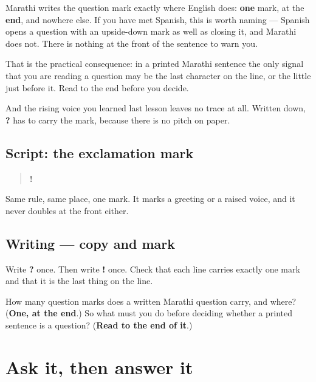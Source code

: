 Marathi writes the question mark exactly where English does: \textbf{one} mark, at the \textbf{end}, and nowhere else. If you have met Spanish, this is worth naming — Spanish opens a question with an upside-down mark as well as closing it, and Marathi does not. There is nothing at the front of the sentence to warn you.

That is the practical consequence: in a printed Marathi sentence the only signal that you are reading a question may be the last character on the line, or the little \textbf{} just before it. Read to the end before you decide.

And the rising voice you learned last lesson leaves no trace at all. Written down, \textbf{?} has to carry the mark, because there is no pitch on paper.

\subsection*{Script: the exclamation mark}
\begin{quote}
\textbf{!}
\end{quote}

Same rule, same place, one mark. It marks a greeting or a raised voice, and it never doubles at the front either.

\subsection*{Writing — copy and mark}
Write \textbf{  ?} once. Then write \textbf{!} once. Check that each line carries exactly one mark and that it is the last thing on the line.

\begin{tcolorbox}[breakable,colback=teal!4,colframe=teal!35!black,title={Before you move on}]
How many question marks does a written Marathi question carry, and where? (\textbf{One, at the end}.) So what must you do before deciding whether a printed sentence is a question? (\textbf{Read to the end of it}.)
\end{tcolorbox}
\section[\texorpdfstring{… \mr{का}? — \mr{हो} / \mr{नाही} (… kā? — ho / nāhī)}{… का? — हो / नाही (… kā? — ho / nāhī)}]{Ask it, then answer it}

\label{lesson:MR-R33-ask-and-answer}



